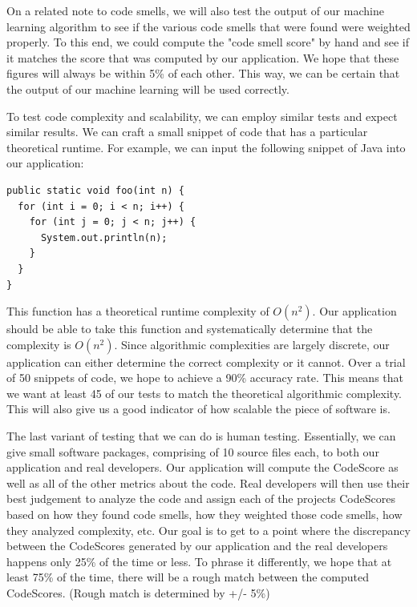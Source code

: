 \documentclass{sig-alternate}
\begin{document}
On a related note to code smells, we will also test the output of our machine learning algorithm to see if the various code smells that were found were weighted properly. To this end, we could compute the "code smell score" by hand and see if it matches the score that was computed by our application. We hope that these figures will always be within 5\% of each other. This way, we can be certain that the output of our machine learning will be used correctly.

To test code complexity and scalability, we can employ similar tests and expect similar results. We can craft a small snippet of code that has a particular theoretical runtime. For example, we can input the following snippet of Java into our application:

\begin{verbatim}
public static void foo(int n) {
  for (int i = 0; i < n; i++) {
    for (int j = 0; j < n; j++) {
      System.out.println(n);
    }
  }
}
\end{verbatim}

This function has a theoretical runtime complexity of $O(n^2)$. Our application should be able to take this function and systematically determine that the complexity is $O(n^2)$. Since algorithmic complexities are largely discrete, our application can either determine the correct complexity or it cannot. Over a trial of 50 snippets of code, we hope to achieve a 90\% accuracy rate. This means that we want at least 45 of our tests to match the theoretical algorithmic complexity. This will also give us a good indicator of how scalable the piece of software is.

The last variant of testing that we can do is human testing. Essentially, we can give small software packages, comprising of 10 source files each, to both our application and real developers. Our application will compute the CodeScore as well as all of the other metrics about the code. Real developers will then use their best judgement to analyze the code and assign each of the projects CodeScores based on how they found code smells, how they weighted those code smells, how they analyzed complexity, etc. Our goal is to get to a point where the discrepancy between the CodeScores generated by our application and the real developers happens only 25\% of the time or less. To phrase it differently, we hope that at least 75\% of the time, there will be a rough match between the computed CodeScores. (Rough match is determined by +/- 5\%)
\end{document}
